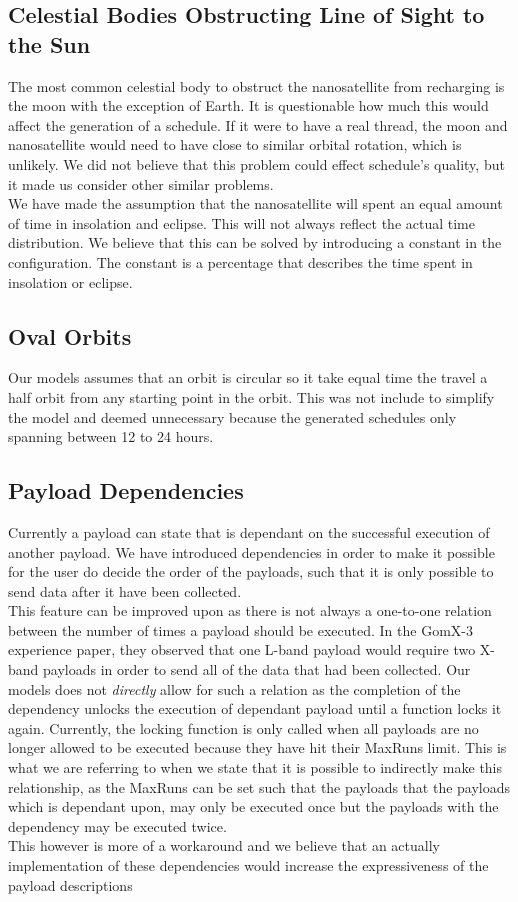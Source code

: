 \subsection*{Celestial Bodies Obstructing Line of Sight to the Sun}
The most common celestial body to obstruct the nanosatellite from recharging is the moon with the exception of Earth.
It is questionable how much this would affect the generation of a schedule. If it were to have a real thread, the moon and nanosatellite would need to have close to similar orbital rotation, which is unlikely. We did not believe that this problem could effect schedule's quality, but it made us consider other similar problems.\\
We have made the assumption that the nanosatellite will spent an equal amount of time in insolation and eclipse. This will not always reflect the actual time distribution. We believe that this can be solved by introducing a constant in the configuration. The constant is a percentage that describes the time spent in insolation or eclipse. 

\subsection*{Oval Orbits}
Our models assumes that an orbit is circular so it take equal time the travel a half orbit from any starting point in the orbit. This was not include to simplify the model and deemed unnecessary because the generated schedules only spanning between 12 to 24 hours. 

\subsection*{Payload Dependencies}
Currently a payload can state that is dependant on the successful execution of another payload. We have introduced dependencies in order to make it possible for the user do decide the order of the payloads, such that it is only possible to send data after it have been collected.\\
This feature can be improved upon as there is not always a one-to-one relation between the number of times a payload should be executed. In the GomX-3 experience paper\cite{gomx3}, they observed that one L-band payload would require two X-band payloads in order to send all of the data that had been collected. Our models does not \textit{directly} allow for such a relation as the completion of the dependency unlocks the execution of dependant payload until a function locks it again. Currently, the locking function is only called when all payloads are no longer allowed to be executed because they have hit their MaxRuns limit. This is what we are referring to when we state that it is possible to indirectly make this relationship, as the MaxRuns can be set such that the payloads that the payloads which is dependant upon, may only be executed once but the payloads with the dependency may be executed twice.\\
This however is more of a workaround and we believe that an actually implementation of these dependencies would increase the expressiveness of the payload descriptions

